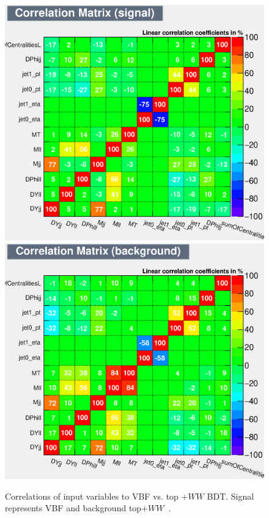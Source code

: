 \begin{figure}[!htbp]
  \centering
  \includegraphics[width=.45\linewidth]{Pictures/VBFvsWW+Top/CorrelationMatrixS.eps}
  \includegraphics[width=.45\linewidth]{Pictures/VBFvsWW+Top/CorrelationMatrixB.eps}
\caption{Correlations of input variables to VBF vs. top +$WW$ BDT. Signal represents VBF and background top+$WW$~\cite{ourSupportNote}.}
\label{fig:SRcorrSB}
\end{figure}

